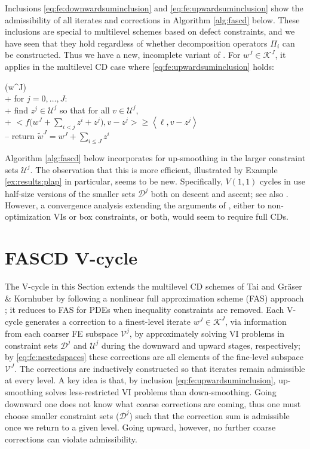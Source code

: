 \documentclass[review,hidelinks,onefignum,onetabnum]{siamart220329}
\newcommand{\ip}[2]{\left<#1,#2\right>}
\begin{document}
Inclusions \eqref{eq:fe:downwardsuminclusion} and \eqref{eq:fe:upwardsuminclusion} show the admissibility of all iterates and corrections in Algorithm \ref{alg:fascd} below.  These inclusions are special to multilevel schemes based on defect constraints, and we have seen that they hold regardless of whether decomposition operators $\Pi_i$ can be constructed.  Thus we have a new, incomplete variant of .  For $w^J\in\mathcal{K}^J$, it applies in the multilevel CD case where \eqref{eq:fe:upwardsuminclusion} holds:

\begin{pseudo*}
(w^J)\text{:} \\+
    for $j = 0,\dots,J$: \\+
        \rm{find} $z^j\in \mathcal{U}^j$ \rm{so that for all} $v \in \mathcal{U}^j$, \\+
            $\displaystyle \Big<f\Big(w^J + \sum_{i<j} z^i + z^j\Big),v-z^j\Big> \ge \ip{\ell}{v-z^j}$ \\--
    return $\tilde w^J=w^J + \sum_{i\le J} z^i$
\end{pseudo*}

Algorithm \ref{alg:fascd} below incorporates  for up-smoothing in the larger constraint sets $\mathcal{U}^j$.  The observation that this is more efficient, illustrated by Example \ref{ex:results:plap} in particular, seems to be new.  Specifically, $V(1,1)$ cycles in \cite{GraeserKornhuber2009} use half-size versions of the smaller sets $\mathcal{D}^j$ both on descent and ascent; see also \cite[section 5.4]{Tai2003}.  However, a convergence analysis extending the arguments of \cite{GraeserKornhuber2009,Tai2003}, either to non-optimization VIs or box constraints, or both, would seem to require full CDs.


\section{FASCD V-cycle} \label{sec:vcycle}

The V-cycle in this Section extends the multilevel CD schemes of Tai \cite{Tai2003} and Gr\"aser \& Kornhuber \cite[Algorithm 4.2]{GraeserKornhuber2009} by following a nonlinear full approximation scheme (FAS) approach \cite{BrandtLivne2011}; it reduces to FAS for PDEs when inequality constraints are removed.  Each V-cycle generates a correction to a finest-level iterate $w^J \in \mathcal{K}^J$, via information from each coarser FE subspace $\mathcal{V}^j$, by approximately solving VI problems in constraint sets $\mathcal{D}^j$ and $\mathcal{U}^j$ during the downward and upward stages, respectively; by \eqref{eq:fe:nestedspaces} these corrections are all elements of the fine-level subspace $\mathcal{V}^J$.  The corrections are inductively constructed so that iterates remain admissible at every level.  A key idea is that, by inclusion \eqref{eq:fe:upwardsuminclusion}, up-smoothing solves less-restricted VI problems than down-smoothing.  Going downward one does not know what coarse corrections are coming, thus one must choose smaller constraint sets ($\mathcal{D}^j$) such that the correction sum is admissible once we return to a given level.  Going upward, however, no further coarse corrections can violate admissibility.
\end{document}
